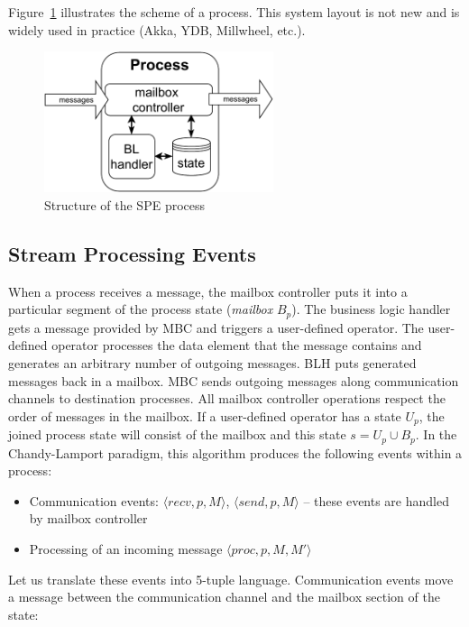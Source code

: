 Figure~\ref{fig:spe_process} illustrates the scheme of a process. This system layout is not new and is widely used in practice (Akka, YDB, Millwheel, etc.).

\begin{figure}[t]
  \centering
  \includegraphics[width=0.6\textwidth]{Chapters/SubstreamConsistency/pics/process-scheme.pdf}
  \caption{Structure of the SPE process}
  \label{fig:spe_process}
\end{figure}

\subsection{Stream Processing Events}

When a process receives a message, the mailbox controller puts it into a particular segment of the process state ({\em mailbox} $B_p$). The business logic handler gets a message provided by MBC and triggers a user-defined operator. The user-defined operator processes the data element that the message contains and generates an arbitrary number of outgoing messages. BLH puts generated messages back in a mailbox. MBC sends outgoing messages along communication channels to destination processes. All mailbox controller operations respect the order of messages in the mailbox. If a user-defined operator has a state $U_p$, the joined process state will consist of the mailbox and this state $s=U_p \cup B_p$. In the Chandy-Lamport paradigm, this algorithm produces the following events within a process:
\begin{itemize}
    \item Communication events: $\langle recv, p, M\rangle$, $\langle send, p, M \rangle$ -- these events are handled by mailbox controller
    \item Processing of an incoming message $\langle proc, p, M, M' \rangle$
\end{itemize}

Let us translate these events into 5-tuple language. Communication events move a message between the communication channel and the mailbox section of the state:

